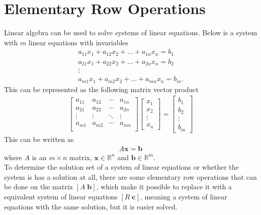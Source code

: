 \section{Elementary Row Operations}
Linear algebra can be used to solve systems of linear equations. Below is a system with $m$ linear equations with invariables
\begin{gather*}
    a_{11}x_1+a_{12}x_2+\hdots + a_{1n}x_n = b_1\\
    a_{21}x_1+a_{22}x_2+\hdots + a_{2n}x_n = b_2\\
    \vdots \\
    a_{m1}x_1+a_{m2}x_2+\hdots + a_{mn}x_n = b_m.
\end{gather*}
This can be represented as the following matrix vector product
\begin{align*}
    \begin{bmatrix}
    a_{1 1} & a_{1 2} & \cdots & a_{1 n}\\
    a_{2 1} & a_{2 2} & \cdots & a_{2 n}\\
    \vdots  &  \vdots & \ddots & \vdots \\
    a_{m 1} & a_{m 2} & \cdots & a_{m n}\\
    \end{bmatrix}
    \begin{bmatrix}
    x_1 \\ x_2 \\ \vdots \\ x_n
    \end{bmatrix}
    = \begin{bmatrix}
    b_1 \\ b_2 \\ \vdots \\ b_m
    \end{bmatrix}
\end{align*}
This can be written as 
\begin{align*}
    A\textbf{x}=\textbf{b}
\end{align*}
where $A$ is an $m\times n$ matrix, $\textbf{x} \in \mathbb{R}^n$ and $\textbf{b} \in \mathbb{R}^m$. \cite[27-28]{LiAl}\\
To determine the solution set of a system of linear equations or whether the system is has a solution at all, there are some elementary row operations that can be done on the matrix $[A\;\textbf{b}]$, which make it possible to replace it with a equivalent system of linear equations $[R\;\textbf{c}]$, meaning a system of linear equations with the same solution, but it is easier solved.
